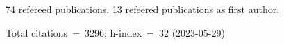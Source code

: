 74 refereed publications. 13 refeered publications as first author.

Total citations~=~3296; h-index~=~32 (2023-05-29)